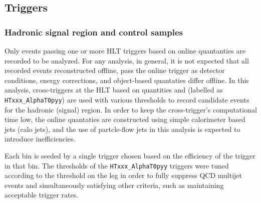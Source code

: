 \subsection{Triggers}

\subsubsection{Hadronic signal region and control samples\label{sec:signal_triggers}} 

Only events passing one or more HLT triggers based on online quantanties 
are recorded to be analyzed. For any analysis, in general, it is 
not expected that all recorded events reconstructed offline, pass the online
trigger as detector conditions, energy corrections, and object-based quantaties
differ offline. In this analysis, cross-triggers at the HLT
based on quantities \scalht and \alphat (labelled as \verb!HTxxx_AlphaT0pyy!) 
are used with various thresholds to record candidate events for the hadronic (signal)
region. In order to keep the cross-trigger's computational time low, the online quantaties
are constructed using simple calorimeter based jets (calo jets), and the use of
partcle-flow jets in this analysis is expected to introduce inefficiencies.

Each \scalht bin is seeded by a single trigger chosen based on the
efficiency of the trigger in that \scalht bin. The \alphat thresholds of the
\verb!HTxxx_AlphaT0pyy! triggers were tuned according to the threshold
on the \scalht leg in order to fully suppress QCD multijet events
and simultaneously satisfying other criteria, such as maintaining
acceptable trigger rates.


